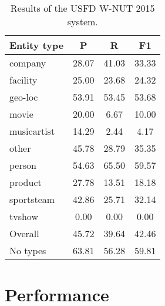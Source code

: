 \documentclass[11pt|a4paper]{article}
\begin{document}
\begin{table}
\footnotesize
\centering
\begin{tabular}{lccc}
\hline
{\bf Entity type} & {\bf P} & {\bf R} & {\bf F1} \\
\hline
          company  & 28.07  & 41.03 &  33.33  \\
         facility  & 25.00  & 23.68 &  24.32  \\
          geo-loc  & 53.91  & 53.45 &  53.68  \\
            movie  & 20.00  &  6.67 &  10.00  \\
      musicartist  & 14.29  &  2.44 &   4.17  \\
            other  & 45.78  & 28.79 &  35.35  \\
           person  & 54.63  & 65.50 &  59.57  \\
          product  & 27.78  & 13.51 &  18.18  \\
       sportsteam  & 42.86  & 25.71 &  32.14  \\
           tvshow  &  0.00  &  0.00 &   0.00  \\
\hline
Overall  & 45.72 &  39.64 &  42.46 \\
\hline
No types & 63.81 &  56.28 &  59.81 \\
\hline
\end{tabular}
\caption{Results of the USFD W-NUT 2015 system.}
\label{tab:results}
\end{table}

\iffalse
accuracy:  94.21%
          company: precision:  28.07%
         facility: precision:  25.00%
          geo-loc: precision:  53.91%
            movie: precision:  20.00%
      musicartist: precision:  14.29%
            other: precision:  45.78%
           person: precision:  54.63%
          product: precision:  27.78%
       sportsteam: precision:  42.86%
           tvshow: precision:   0.00%

precision:  63.81%
\fi



\section{Performance}
\end{document}
